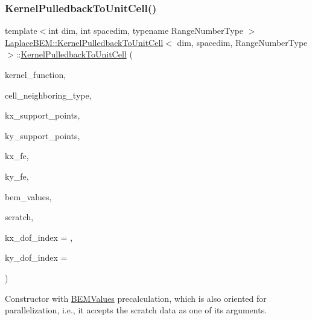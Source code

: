 \subsubsection{\texorpdfstring{Kernel\+Pulledback\+To\+Unit\+Cell()}{KernelPulledbackToUnitCell()}\hspace{0.1cm}{\footnotesize\ttfamily [3/3]}}
{\footnotesize\ttfamily template$<$int dim, int spacedim, typename Range\+Number\+Type $>$ \\
\hyperlink{classLaplaceBEM_1_1KernelPulledbackToUnitCell}{Laplace\+B\+E\+M\+::\+Kernel\+Pulledback\+To\+Unit\+Cell}$<$ dim, spacedim, Range\+Number\+Type $>$\+::\hyperlink{classLaplaceBEM_1_1KernelPulledbackToUnitCell}{Kernel\+Pulledback\+To\+Unit\+Cell} (\begin{DoxyParamCaption}\item[{const \hyperlink{classLaplaceBEM_1_1LaplaceKernel_1_1KernelFunction}{Laplace\+Kernel\+::\+Kernel\+Function}$<$ spacedim, Range\+Number\+Type $>$ \&}]{kernel\+\_\+function,  }\item[{const Cell\+Neighboring\+Type \&}]{cell\+\_\+neighboring\+\_\+type,  }\item[{const std\+::vector$<$ Point$<$ spacedim $>$$>$ \&}]{kx\+\_\+support\+\_\+points,  }\item[{const std\+::vector$<$ Point$<$ spacedim $>$$>$ \&}]{ky\+\_\+support\+\_\+points,  }\item[{const Finite\+Element$<$ dim, spacedim $>$ \&}]{kx\+\_\+fe,  }\item[{const Finite\+Element$<$ dim, spacedim $>$ \&}]{ky\+\_\+fe,  }\item[{const \hyperlink{classLaplaceBEM_1_1BEMValues}{B\+E\+M\+Values}$<$ dim, spacedim, Range\+Number\+Type $>$ $\ast$}]{bem\+\_\+values,  }\item[{const \hyperlink{structLaplaceBEM_1_1PairCellWiseScratchData}{Pair\+Cell\+Wise\+Scratch\+Data} $\ast$}]{scratch,  }\item[{const unsigned int}]{kx\+\_\+dof\+\_\+index = {},  }\item[{const unsigned int}]{ky\+\_\+dof\+\_\+index = {} }\end{DoxyParamCaption})}

Constructor with {\ttfamily \hyperlink{classLaplaceBEM_1_1BEMValues}{B\+E\+M\+Values}} precalculation, which is also oriented for parallelization, i.\+e., it accepts the scratch data as one of its arguments.


